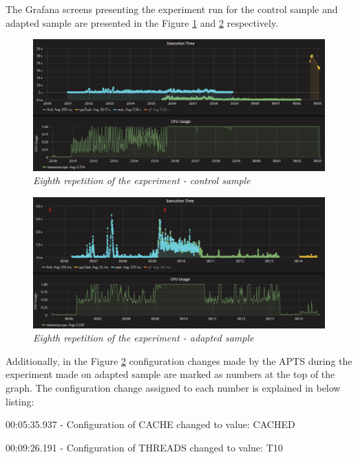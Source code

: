 \documentclass[12pt,a4paper]{article}
\let\tmpone\enumerate
\let\tmptwo\endenumerate
\renewenvironment{enumerate}{\tmpone\addtolength{\itemsep}{-0.4\baselineskip}}{\tmptwo}
\begin{document}
The Grafana screens presenting the experiment run for the control sample and adapted sample are presented in the Figure \ref{figure:random:screen:control:8} and \ref{figure:random:screen:adapted:8} respectively. 

\begin{figure}[!htb]
\centering
\includegraphics[width=1\textwidth]{8-ctrl}
\caption{\textit{Eighth repetition of the experiment - control sample}} \label{figure:random:screen:control:8}
\end{figure}

\begin{figure}[!htb]
\centering
\includegraphics[width=1\textwidth]{8-adap}
\caption{\textit{Eighth repetition of the experiment - adapted sample}} \label{figure:random:screen:adapted:8}
\end{figure}

Additionally, in the Figure \ref{figure:random:screen:adapted:8} configuration changes made by the APTS during the experiment made on adapted sample are marked as numbers at the top of the graph. The configuration change assigned to each number is explained in below listing: 

\begin{enumerate}
\item 00:05:35.937 - Configuration of CACHE changed to value: CACHED
\item 00:09:26.191 - Configuration of THREADS changed to value: T10
\end{enumerate}
\end{document}
